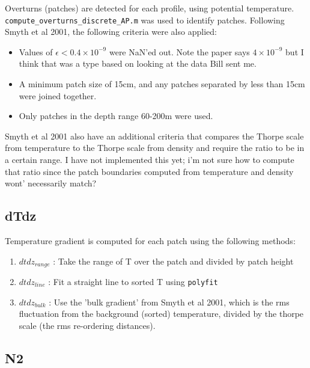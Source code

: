 \documentclass[11pt]{article}
\begin{document}
Overturns (patches) are detected for each profile, using potential temperature. \newline
\verb+compute_overturns_discrete_AP.m+ was used to identify patches. \newline
Following Smyth et al 2001, the following criteria were also applied:
\begin{itemize}
\item Values of $\epsilon <0.4\times 10^{-9}$ were NaN'ed out. Note the paper says $4\times 10^{-9}$ but I think that was a type based on looking at the data Bill sent me.
\item A minimum patch size of 15cm, and any patches separated by less than 15cm were joined together.
\item Only patches in the depth range 60-200m were used.
\end{itemize}

Smyth et al 2001 also have an additional criteria that compares the Thorpe scale from temperature to the Thorpe scale from density and require the ratio to be in a certain range. I have not implemented this yet; i'm not sure how to compute that ratio since the patch boundaries computed from temperature and density wont' necessarily match?


\subsection{dTdz}

Temperature gradient is computed for each patch using the following methods:
\begin{enumerate}
\item $dtdz_{range}$ : Take the range of T over the patch and divided by patch height
\item $dtdz_{line}$ : Fit a straight line to sorted T using \verb+polyfit+
\item $dtdz_{bulk}$ : Use the 'bulk gradient' from Smyth et al 2001, which is the rms fluctuation from the background (sorted) temperature, divided by the thorpe scale (the rms re-ordering distances).
\end{enumerate}


\subsection{N2}
\end{document}

